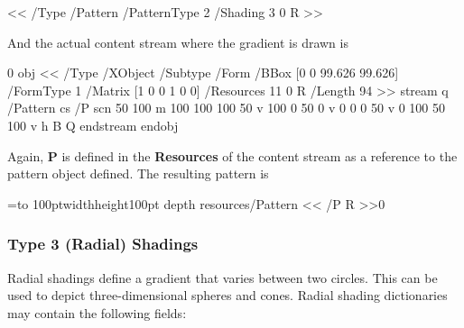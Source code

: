 \blisting
<<
    /Type /Pattern  %
    /PatternType 2  %
    /Shading 3 0 R  %
>> 
\elisting

\noindent And the actual content stream where the gradient is drawn is

 0 obj
<<
/Type /XObject
/Subtype /Form
/BBox [0 0 99.626 99.626]
/FormType 1
/Matrix [1 0 0 1 0 0]
/Resources 11 0 R
/Length 94        
>>
stream
q
/Pattern cs
/P scn
50 100 m
100 100 100 50 v 100 0 50 0 v 0 0 0 50 v 0 100 50 100 v %
h
B                                                       %
Q 
endstream
endobj
\elisting

\noindent Again, {\bf P} is defined in the {\bf Resources} of the content stream as a reference to the pattern
object defined.
The resulting pattern is

\immediate{}

\immediate{}

\immediate{}

\bgroup
{}=\hbox to 100pt{\vrule width\z@ height100pt depth\z@%
    \hfil
}
\pdfxform resources{/Pattern << /P \the\pdflastobj{} R >>}0

\centerline{\pdfrefxform\pdflastxform}
\egroup

\subsubsection{Type 3 (Radial) Shadings}

Radial shadings define a gradient that varies between two circles.
This can be used to depict three-dimensional spheres and cones.
Radial shading dictionaries may contain the following fields:

